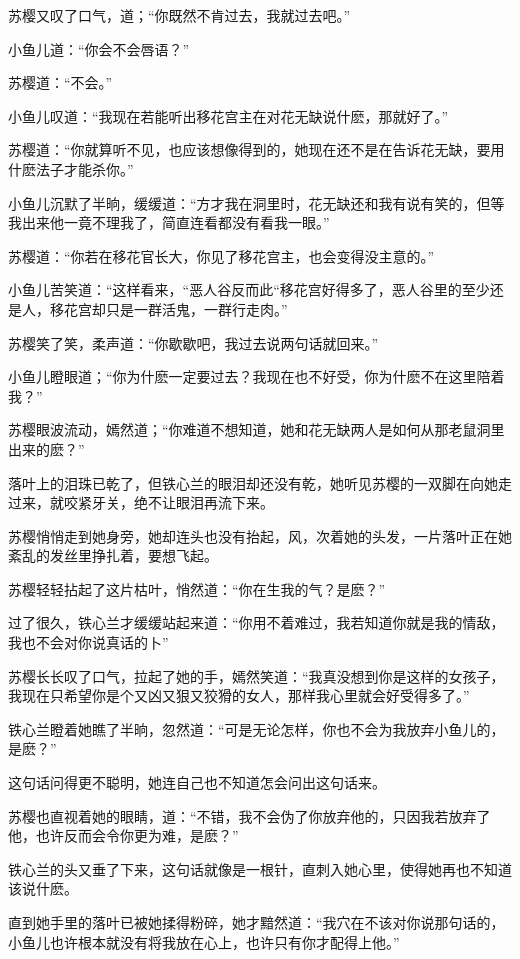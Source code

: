 \documentclass[12pt,oneside]{book}
\begin{document}
苏樱又叹了口气，道；``你既然不肯过去，我就过去吧。''

小鱼儿道：``你会不会唇语？''

苏樱道：``不会。''

小鱼儿叹道：``我现在若能听出移花宫主在对花无缺说什麽，那就好了。''

苏樱道：``你就算听不见，也应该想像得到的，她现在还不是在告诉花无缺，要用什麽法子才能杀你。''

小鱼儿沉默了半晌，缓缓道：``方才我在洞里时，花无缺还和我有说有笑的，但等我出来他一竟不理我了，简直连看都没有看我一眼。''

苏樱道：``你若在移花官长大，你见了移花宫主，也会变得没主意的。''

小鱼儿苦笑道：``这样看来，``恶人谷反而此``移花宫好得多了，恶人谷里的至少还是人，移花宫却只是一群活鬼，一群行走肉。''

苏樱笑了笑，柔声道：``你歇歇吧，我过去说两句话就回来。''

小鱼儿瞪眼道；``你为什麽一定要过去？我现在也不好受，你为什麽不在这里陪着我？''

苏樱眼波流动，嫣然道；``你难道不想知道，她和花无缺两人是如何从那老鼠洞里出来的麽？''

落叶上的泪珠已乾了，但铁心兰的眼泪却还没有乾，她听见苏樱的一双脚在向她走过来，就咬紧牙关，绝不让眼泪再流下来。

苏樱悄悄走到她身旁，她却连头也没有抬起，风，次着她的头发，一片落叶正在她紊乱的发丝里挣扎着，要想飞起。

苏樱轻轻拈起了这片枯叶，悄然道：``你在生我的气？是麽？''

过了很久，铁心兰才缓缓站起来道：``你用不着难过，我若知道你就是我的情敌，我也不会对你说真话的卜''

苏樱长长叹了口气，拉起了她的手，嫣然笑道：``我真没想到你是这样的女孩子，我现在只希望你是个又凶又狠又狡猾的女人，那样我心里就会好受得多了。''

铁心兰瞪着她瞧了半晌，忽然道：``可是无论怎样，你也不会为我放弃小鱼儿的，是麽？''

这句话问得更不聪明，她连自己也不知道怎会问出这句话来。

苏樱也直视着她的眼睛，道：``不错，我不会伪了你放弃他的，只因我若放弃了他，也许反而会令你更为难，是麽？''

铁心兰的头又垂了下来，这句话就像是一根针，直刺入她心里，使得她再也不知道该说什麽。

直到她手里的落叶已被她揉得粉碎，她才黯然道：``我穴在不该对你说那句话的，小鱼儿也许根本就没有将我放在心上，也许只有你才配得上他。''
\end{document}
